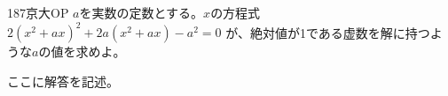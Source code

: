 \begin{thm}{187}{}{京大OP}
 $a$を実数の定数とする。$x$の方程式 $2(x^2+ax)^2+2a(x^2+ax)-a^2=0$ が、絶対値が1である虚数を解に持つような$a$の値を求めよ。
\end{thm}

ここに解答を記述。